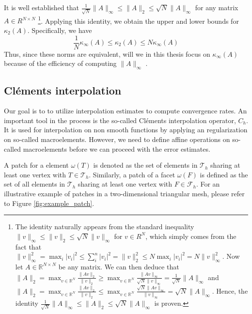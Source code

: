 \documentclass[11pt]{article}
\theoremstyle{remark}
\newcommand{\abs}[1]{\left\lvert #1 \right\rvert}
\renewcommand{\le}{\leqslant}
\renewcommand{\ge}{\geqslant}
\numberwithin{equation}{section}
\begin{document}
It is well established that $ \frac{1}{\sqrt{N} }  \| A \|_{ \infty }^{  }  \le \| A \|_{2  }^{  } \le
\sqrt{N}  \| A \|_{\infty  }^{  }  $ for any matrix $A \in R^{N\times N}$  \footnote{
    The identity naturally appears from the standard inequality $\| v \|_{ \infty }^{  } \le  \| v \|_{2  }^{  } \le \sqrt{N}  \| v \|_{ \infty }^{  }   $ for $v \in R^{N}$, which simply comes from the fact that  $ \| v \|_{\infty  }^{ 2 } = \max_{i} \abs{ v_{i} }^{2} \le \sum_{i}^{n}   \abs{ v_{i} }^{2} = \| v \|_{ 2 }^{2  } \le N      \max_{i} \abs{ v_{i} }^{2} = N \| v \|_{
    \infty}^{ 2 }$. Now let $A\in \mathbb{R} ^{N \times N}$ be any matrix. We can then deduce that $ \| A \|_{ 2 }^{  } = \max_{v \in \mathbb{R} ^{N}} \frac{\| Av \|_{2  }^{  }}{\| v \|_{ 2 }^{  } } \ge \max_{v \in \mathbb{R} ^{N}}
    \frac{\| Av \|_{ \infty  }^{  }}{ \sqrt{N} \| v \|_{ \infty}^{  } } = \frac{1}{ \sqrt{N} } \| A \|_{ \infty }^{  }    $ and $ \| A \|_{ 2 }^{  } = \max_{v \in \mathbb{R} ^{N}} \frac{\| Av \|_{2  }^{  }}{\| v \|_{ 2 }^{  } } \le  \max_{v \in \mathbb{R} ^{N}}
    \frac{\sqrt{N} \| Av \|_{ \infty  }^{  }}{  \| v \|_{ \infty}^{  } } =  \sqrt{N} \| A \|_{ \infty }^{  }    $. Hence, the identity $\frac{1}{\sqrt{N} } \| A \|_{\infty  }^{  } \le \| A \|_{ 2 }^{  }\le \sqrt{N} \| A \|_{ \infty  }^{  }   $  is proven.

}. Applying this identity, we obtain the upper and lower bounds for $\kappa_{2}(A)$. Specifically, we have
\begin{equation}
\frac{1}{N} \kappa_{\infty} ( A) \le  \kappa_{2} ( A) \le N \kappa _{\infty}(A)
\end{equation}
Thus, since these norms are equivalent, will we in this thesis focus on $ \kappa_{\infty}( A)  $ because of the efficiency of computing $\| A \|_{ \infty }^{  } $  .

\subsection{Cléments interpolation}%
\label{ssub:clement_operator}
Our goal is to to utilize interpolation estimates to compute convergence rates. An important tool in the process is the so-called Cléments interpolation operator, $C_{h}$.
It is used for interpolation on non smooth functions by applying an regularization on so-called macroelements. However, we need to define affine operations on so-called macroelements before we can proceed with the error estimates.

A patch for a element $\omega \left( T \right) $ is denoted as the set of elements in $\mathcal{T} _{h}$  sharing at least one vertex with $T \in \mathcal{T} _{h}$. Similarly,  a patch of a facet $\omega \left( F \right) $ is defined as the set of all elements in $\mathcal{T}_{h} $
sharing at least one vertex with $F \in  \mathcal{F} _{h}$. For an illustrative example of patches in a two-dimensional triangular mesh, please refer to Figure \ref{fig:example_patch}.
\end{document}
